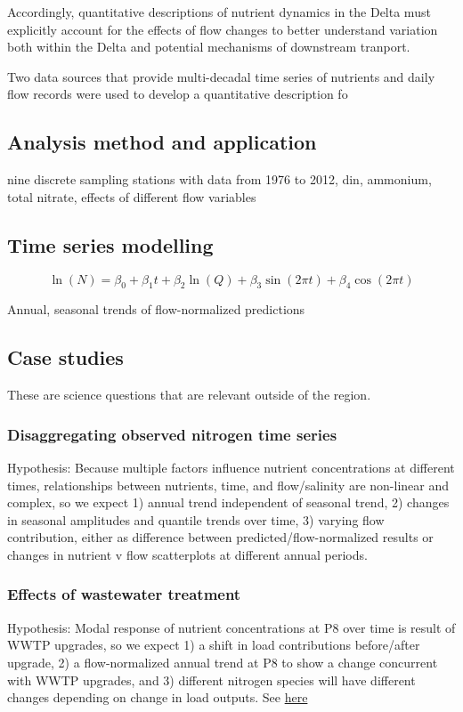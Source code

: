 \documentclass[letterpaper,12pt,oneside]{article}\usepackage[]{graphicx}\usepackage[]{color}
\begin{document}
Accordingly, quantitative descriptions of nutrient dynamics in the Delta must explicitly account for the effects of flow changes to better understand variation both within the Delta and potential mechanisms of downstream tranport.  

Two data sources that provide multi-decadal time series of nutrients and daily flow records were used to develop a quantitative description fo    

\subsection{Analysis method and application}

nine discrete sampling stations with data from 1976 to 2012, \ac{din}, ammonium, total nitrate, effects of different flow variables

\subsection{Time series modelling}

\begin{equation}
\ln\left(N\right) = \beta_0 + \beta_1 t + \beta_2 \ln\left(Q\right) + \beta_3 \sin\left(2\pi t\right) + \beta_4 \cos\left(2\pi t\right)
\end{equation}  

Annual, seasonal trends of flow-normalized predictions

\subsection{Case studies}
These are science questions that are relevant outside of the region.
\subsubsection{Disaggregating observed nitrogen time series}
Hypothesis: Because multiple factors influence nutrient concentrations at different times, relationships between nutrients, time, and flow/salinity are non-linear and complex, so we expect 1) annual trend independent of seasonal trend, 2) changes in seasonal amplitudes and quantile trends over time, 3) varying flow contribution, either as difference between predicted/flow-normalized results or changes in nutrient v flow scatterplots at different annual periods.
\subsubsection{Effects of wastewater treatment}
Hypothesis: Modal response of nutrient concentrations at P8 over time is result of WWTP upgrades, so we expect 1) a shift in load contributions before/after upgrade, 2) a flow-normalized annual trend at P8 to show a change concurrent with WWTP upgrades, and 3) different nitrogen species will have different changes depending on change in load outputs. See \href{http://www.waterboards.ca.gov/centralvalley/board_decisions/adopted_orders/san_joaquin/r5-2008-0086_res.pdf}{here}
\end{document}
